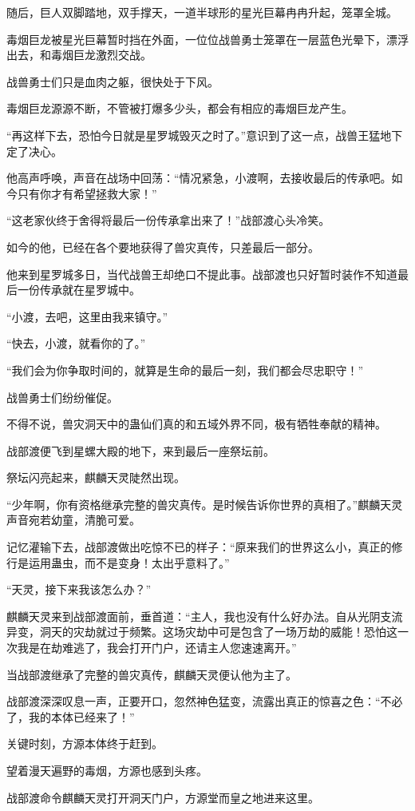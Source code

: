 \begin{this_body}
随后，巨人双脚踏地，双手撑天，一道半球形的星光巨幕冉冉升起，笼罩全城。

毒烟巨龙被星光巨幕暂时挡在外面，一位位战兽勇士笼罩在一层蓝色光晕下，漂浮出去，和毒烟巨龙激烈交战。

战兽勇士们只是血肉之躯，很快处于下风。

毒烟巨龙源源不断，不管被打爆多少头，都会有相应的毒烟巨龙产生。

“再这样下去，恐怕今日就是星罗城毁灭之时了。”意识到了这一点，战兽王猛地下定了决心。

他高声呼唤，声音在战场中回荡：“情况紧急，小渡啊，去接收最后的传承吧。如今只有你才有希望拯救大家！”

“这老家伙终于舍得将最后一份传承拿出来了！”战部渡心头冷笑。

如今的他，已经在各个要地获得了兽灾真传，只差最后一部分。

他来到星罗城多日，当代战兽王却绝口不提此事。战部渡也只好暂时装作不知道最后一份传承就在星罗城中。

“小渡，去吧，这里由我来镇守。”

“快去，小渡，就看你的了。”

“我们会为你争取时间的，就算是生命的最后一刻，我们都会尽忠职守！”

战兽勇士们纷纷催促。

不得不说，兽灾洞天中的蛊仙们真的和五域外界不同，极有牺牲奉献的精神。

战部渡便飞到星螺大殿的地下，来到最后一座祭坛前。

祭坛闪亮起来，麒麟天灵陡然出现。

“少年啊，你有资格继承完整的兽灾真传。是时候告诉你世界的真相了。”麒麟天灵声音宛若幼童，清脆可爱。

记忆灌输下去，战部渡做出吃惊不已的样子：“原来我们的世界这么小，真正的修行是运用蛊虫，而不是变身！太出乎意料了。”

“天灵，接下来我该怎么办？”

麒麟天灵来到战部渡面前，垂首道：“主人，我也没有什么好办法。自从光阴支流异变，洞天的灾劫就过于频繁。这场灾劫中可是包含了一场万劫的威能！恐怕这一次我是在劫难逃了，我会打开门户，还请主人您速速离开。”

当战部渡继承了完整的兽灾真传，麒麟天灵便认他为主了。

战部渡深深叹息一声，正要开口，忽然神色猛变，流露出真正的惊喜之色：“不必了，我的本体已经来了！”

关键时刻，方源本体终于赶到。

望着漫天遍野的毒烟，方源也感到头疼。

战部渡命令麒麟天灵打开洞天门户，方源堂而皇之地进来这里。


\end{this_body}
